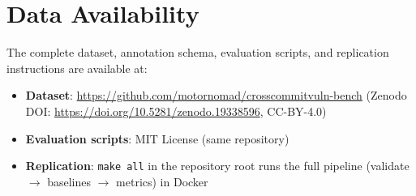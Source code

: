 \documentclass[sigconf,review]{acmart}
\begin{document}
\section{Data Availability}

The complete dataset, annotation schema, evaluation scripts, and replication instructions
are available at:
\begin{itemize}
  \item \textbf{Dataset}: \url{https://github.com/motornomad/crosscommitvuln-bench}
        (Zenodo DOI: \url{https://doi.org/10.5281/zenodo.19338596}, CC-BY-4.0)
  \item \textbf{Evaluation scripts}: MIT License (same repository)
  \item \textbf{Replication}: \texttt{make all} in the repository root runs the full
        pipeline (validate $\to$ baselines $\to$ metrics) in Docker
\end{itemize}



\end{document}
